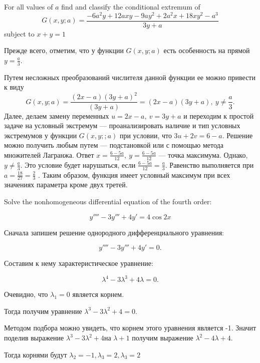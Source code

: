 \documentclass[addpoints]{exam} %
\begin{document}
\begin{questions}
\question[10] For all values of $a$ find and classify the conditional extremum of
\[
G\left(x,y;a\right)=\frac{-6a^2y+12axy-9ay^2+2a^2x+18xy^2-a^3}{3y+a}
\]
subject to $x + y = 1$

\begin{solution}
Прежде всего, отметим, что у функции $G\left(x,y;a\right)$ есть особенность на прямой $y=\frac{a}{3}$.

Путем несложных преобразований числителя данной функции ее можно привести к виду
\[
G\left(x,y;a\right)=\frac{\left(2x-a\right){\left(3y+a\right)}^2}{\left(3y+a\right)}=\left(2x-a\right)\left(3y+a\right),\ y\ne \frac{a}{3}.
\]
Далее, делаем замену переменных $u=2x-a,\ v=3y+a$ и переходим к простой задаче на условный экстремум --- проанализировать наличие и тип условных экстремумов у функции $G\left(x,y;;a\right)$ при условии, что $3u+2v=6-a$. Решение можно получить любым путем --- подстановкой или с помощью метода множителей Лагранжа. Ответ $x=\frac{6-5a}{12},\ y=\frac{6-5a}{12}$ --- точка максимума. Однако, $y\ne \frac{a}{3}$. Это условие будет нарушаться, если $\frac{6-5a}{12}=\frac{a}{3}$. Равенство выполняется при $a=\frac{18}{27}=\frac{2}{3}$ . Таким образом, функция имеет условный максимум при всех значениях параметра кроме двух третей.

\end{solution}





\question[10] Solve the nonhomogeneous differential equation of the fourth order:

\[
y'''' -3y''' +4y' =4\cos 2x
\]

\begin{solution}
Сначала запишем решение однородного дифференциального уравнения:

\[y'''' -3y''' +4y' =0.\]

Составим к нему характеристическое уравнение:

\[\lambda ^{4} -3\lambda ^{3} +4\lambda =0.\]

Очевидно, что $\lambda _{1} =0$ является корнем.

Тогда получим уравнение $\lambda ^{3} -3\lambda ^{2} +4=0$.

Методом подбора можно увидеть, что корнем этого уравнения является -1. Значит поделив выражение $\lambda ^{3} -3\lambda ^{2} +4$на $\lambda +1$ получим выражение $\lambda ^{2} -4\lambda +4$.

Тогда корнями будут $\lambda _{2} =-1,\lambda _{3} =2,\lambda _{3} =2$


\end{solution}
\end{questions}
\end{document}
